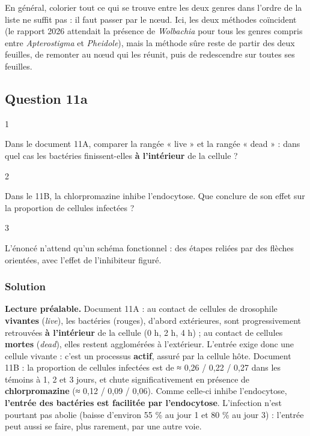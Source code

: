\documentclass[11pt,a4paper]{article}
\begin{document}
\begin{piege}

En général, colorier tout ce qui se trouve entre les deux genres dans l'ordre de la liste ne suffit pas : il faut passer par le nœud. Ici, les deux méthodes coïncident (le rapport 2026 attendait la présence de \emph{Wolbachia} pour tous les genres compris entre \emph{Apterostigma} et \emph{Pheidole}), mais la méthode sûre reste de partir des deux feuilles, de remonter au nœud qui les réunit, puis de redescendre sur toutes ses feuilles.

\end{piege}

\hypertarget{question-11a}{%
\subsection{Question 11a}\label{question-11a}}

\begin{indication}{1}

Dans le document 11A, comparer la rangée « live » et la rangée « dead » : dans quel cas les bactéries finissent-elles \textbf{à l'intérieur} de la cellule ?

\end{indication}

\begin{indication}{2}

Dans le 11B, la chlorpromazine inhibe l'endocytose. Que conclure de son effet sur la proportion de cellules infectées ?

\end{indication}

\begin{indication}{3}

L'énoncé n'attend qu'un schéma fonctionnel : des étapes reliées par des flèches orientées, avec l'effet de l'inhibiteur figuré.

\end{indication}

\hypertarget{solution-66}{%
\subsubsection{Solution}\label{solution-66}}

\textbf{Lecture préalable.} Document 11A : au contact de cellules de drosophile \textbf{vivantes} (\emph{live}), les bactéries (rouges), d'abord extérieures, sont progressivement retrouvées \textbf{à l'intérieur} de la cellule (0 h, 2 h, 4 h) ; au contact de cellules \textbf{mortes} (\emph{dead}), elles restent agglomérées à l'extérieur. L'entrée exige donc une cellule vivante : c'est un processus \textbf{actif}, assuré par la cellule hôte. Document 11B : la proportion de cellules infectées est de ≈ 0,26 / 0,22 / 0,27 dans les témoins à 1, 2 et 3 jours, et chute significativement en présence de \textbf{chlorpromazine} (≈ 0,12 / 0,09 / 0,06). Comme celle-ci inhibe l'endocytose, \textbf{l'entrée des bactéries est facilitée par l'endocytose}. L'infection n'est pourtant pas abolie (baisse d'environ 55 \% au jour 1 et 80 \% au jour 3) : l'entrée peut aussi se faire, plus rarement, par une autre voie.
\end{document}
